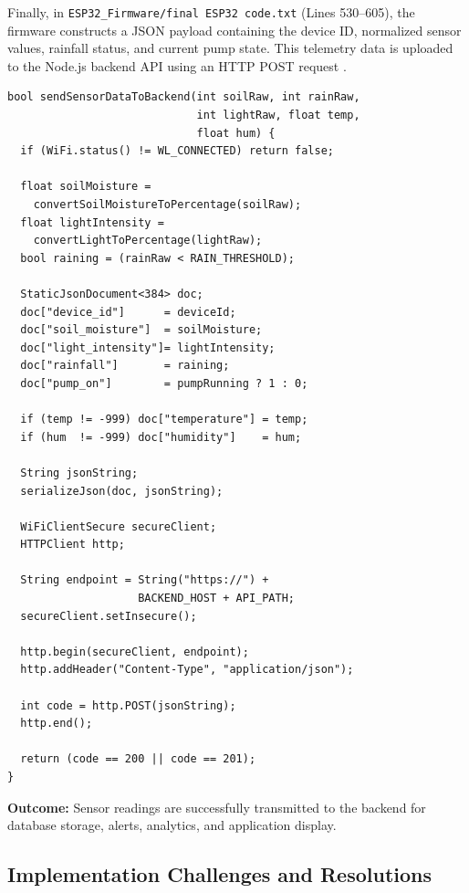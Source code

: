 Finally, in \texttt{ESP32\_Firmware/final ESP32 code.txt} (Lines 530--605), the firmware constructs a JSON payload containing the device ID, normalized sensor 
values, rainfall status, and current pump state. This telemetry data is uploaded to 
the Node.js backend API using an HTTP POST request \cite{yokotani2016mqtt}.

\begin{lstlisting}
bool sendSensorDataToBackend(int soilRaw, int rainRaw,
                             int lightRaw, float temp, 
                             float hum) {
  if (WiFi.status() != WL_CONNECTED) return false;

  float soilMoisture = 
    convertSoilMoistureToPercentage(soilRaw);
  float lightIntensity = 
    convertLightToPercentage(lightRaw);
  bool raining = (rainRaw < RAIN_THRESHOLD);

  StaticJsonDocument<384> doc;
  doc["device_id"]      = deviceId;
  doc["soil_moisture"]  = soilMoisture;
  doc["light_intensity"]= lightIntensity;
  doc["rainfall"]       = raining;
  doc["pump_on"]        = pumpRunning ? 1 : 0;

  if (temp != -999) doc["temperature"] = temp;
  if (hum  != -999) doc["humidity"]    = hum;

  String jsonString;
  serializeJson(doc, jsonString);

  WiFiClientSecure secureClient;
  HTTPClient http;

  String endpoint = String("https://") + 
                    BACKEND_HOST + API_PATH;
  secureClient.setInsecure();

  http.begin(secureClient, endpoint);
  http.addHeader("Content-Type", "application/json");

  int code = http.POST(jsonString);
  http.end();

  return (code == 200 || code == 201);
}
\end{lstlisting}

\textbf{Outcome:} Sensor readings are successfully transmitted to 
the backend for database storage, alerts, analytics, and 
application display.

\subsection{Implementation Challenges and Resolutions}
\label{sec:challenges}

